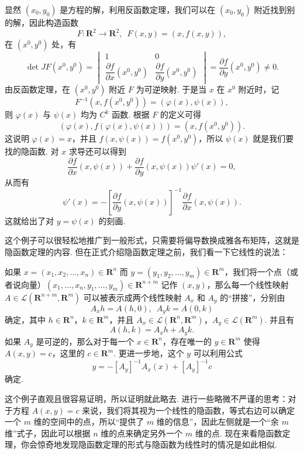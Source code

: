 \begin{solution}
    显然 $(x_0, y_0)$ 是方程的解，利用反函数定理，我们可以在 $(x_0, y_0)$ 附近找到别的解，因此构造函数\[F\colon \mathbf{R}^2\to \mathbf{R}^2,\enspace F(x, y) = (x, f(x, y)),\]
    在 $(x^0, y^0)$ 处，有 \[\det JF(x^0, y^0) = \begin{vmatrix}
            1                                        & 0                                        \\[1ex]
            \dfrac{\partial f}{\partial x}(x^0, y^0) & \dfrac{\partial f}{\partial y}(x^0, y^0)
        \end{vmatrix} = \dfrac{\partial f}{\partial y}(x^0, y^0)\neq 0.\]
    由反函数定理，在 $(x^0, y^0)$ 附近 $F$ 为可逆映射. 于是当 $x$ 在 $x^0$ 附近时，记 \[F^{-1}(x, f(x^0, y^0)) = (\varphi(x), \psi(x)),\]
    则 $\varphi(x)$ 与 $\psi(x)$ 均为 $C^k$ 函数. 根据 $F$ 的定义可得 \[(\varphi(x), f(\varphi(x), \psi(x))) = (x, f(x^0, y^0)).\]
    这说明 $\varphi(x) = x$，并且 $f(x, \psi(x)) = f(x^0, y^0)$，所以 $\psi(x)$ 就是我们要找的隐函数. 对 $x$ 求导还可以得到 \[\frac{\partial f}{\partial x}(x, \psi(x)) + \frac{\partial f}{\partial y}(x, \psi(x))\psi'(x) = 0,\]
    从而有 \[\psi'(x) = -[\frac{\partial f}{\partial y}(x, \psi(x))]^{-1}\frac{\partial f}{\partial x}(x, \psi(x)).\]
    这就给出了对 $y = \psi(x)$ 的刻画.
\end{solution}

这个例子可以很轻松地推广到一般形式，只需要将偏导数换成雅各布矩阵，这就是隐函数定理的内容. 但在正式介绍隐函数定理之前，我们看一下它线性的说法：

\begin{example}{}{}
    如果 $x = (x_1, x_2, \ldots, x_n)\in\mathbf{R}^n$ 而 $y = (y_1, y_2, \ldots, y_m)\in\mathbf{R}^m$，我们将一个点（或者说向量）$(x_1, \ldots, x_n, y_1, \ldots, y_m)\in \mathbf{R}^{n+m}$ 记作 $(x, y)$，那么每一个线性映射 $A\in \mathcal{L}(\mathbf{R}^{n+m}, \mathbf{R}^{m})$ 可以被表示成两个线性映射 $A_x$ 和 $A_y$ 的“拼接”，分别由 \[A_xh = A(h, 0),\enspace A_yk = A(0, k)\]
    确定，其中 $h\in\mathbf{R}^n$，$k\in\mathbf{R}^m$，并且 $A_x\in \mathcal{L}(\mathbf{R}^n, \mathbf{R}^m)$，$A_y\in \mathcal{L}(\mathbf{R}^m)$. 并且有 \[A(h, k) = A_xh + A_yk.\]
    如果 $A_y$ 是可逆的，那么对于每一个 $x\in\mathbf{R}^n$，存在唯一的 $y\in\mathbf{R}^m$ 使得 $A(x, y) = c$，这里的 $c\in\mathbf{R}^m$. 更进一步地，这个 $y$ 可以利用公式 \[y = -[A_y]^{-1}A_x(x) + [A_y]^{-1}c\] 确定.
\end{example}

这个例子直观且很容易证明，所以证明就此略去. 进行一些略微不严谨的思考：对于方程 $A(x, y) = c$ 来说，我们将其视为一个线性的隐函数，等式右边可以确定一个 $m$ 维的空间中的点，所以“提供了 $m$ 维的信息”，因此左侧就是一个“余 $m$ 维”式子，因此可以根据 $n$ 维的点来确定另外一个 $m$ 维的点. 现在来看隐函数定理，你会惊奇地发现隐函数定理的形式与隐函数为线性时的情况是如此相似.

